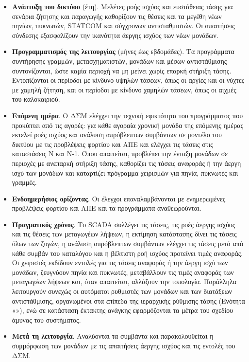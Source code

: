 \begin{itemize}
\item \textbf{Ανάπτυξη του δικτύου} (έτη). Μελέτες ροής ισχύος και ευστάθειας τάσης για
      σενάρια ζήτησης και παραγωγής καθορίζουν τις θέσεις και τα μεγέθη νέων πηνίων, πυκνωτών,
      STATCOM και σύγχρονων αντισταθμιστών. Οι απαιτήσεις σύνδεσης εξασφαλίζουν την ικανότητα
      άεργης ισχύος των νέων μονάδων.
\item \textbf{Προγραμματισμός της λειτουργίας} (μήνες έως εβδομάδες). Τα προγράμματα
      συντήρησης γραμμών, μετασχηματιστών, μονάδων και μέσων αντιστάθμισης συντονίζονται,
      ώστε καμία περιοχή να μη μείνει χωρίς επαρκή στήριξη τάσης. Εντοπίζονται οι περίοδοι με
      κίνδυνο υψηλών τάσεων, όπως οι αργίες και οι νύχτες με χαμηλή ζήτηση, και οι περίοδοι με
      κίνδυνο χαμηλών τάσεων, όπως οι αιχμές του καλοκαιριού.
\item \textbf{Επόμενη ημέρα}. Ο ΔΣΜ ελέγχει την τεχνική εφικτότητα του προγράμματος που
      προκύπτει από τις αγορές: για κάθε αγοραία χρονική μονάδα της επόμενης ημέρας εκτελεί
      ροές ισχύος και ανάλυση απρόβλεπτων συμβάντων σε μοντέλο του δικτύου με τις προβλέψεις φορτίου
      και ΑΠΕ και ελέγχει τις τάσεις στις καταστάσεις N και N-1. Όπου απαιτείται, προβλέπει την
      ένταξη μονάδων σε περιοχές με ανεπαρκή στήριξη τάσης, καθορίζει τις τάσεις αναφοράς ή την
      άεργη ισχύ των μονάδων και καταρτίζει πρόγραμμα χειρισμών για πηνία, πυκνωτές και
      γραμμές.
\item \textbf{Ενδοημερήσιος ορίζοντας}. Οι έλεγχοι επαναλαμβάνονται με ενημερωμένες
      προβλέψεις φορτίου και ΑΠΕ και τα προγράμματα αναθεωρούνται.
\item \textbf{Πραγματικός χρόνος}. Το SCADA συλλέγει τις τάσεις, τις ροές άεργης ισχύος και τις
      θέσεις των μεταγωγέων λήψεων, η εκτίμηση κατάστασης δίνει τις τάσεις όλων των ζυγών, η
      ανάλυση απρόβλεπτων συμβάντων ελέγχει τις τάσεις μετά από κάθε συμβάν του καταλόγου και
      η βέλτιστη ροή ισχύος προτείνει τιμές αναφοράς. Οι χειριστές εκδίδουν εντολές για τις
      τάσεις αναφοράς ή την άεργη ισχύ των μονάδων, ζευγνύουν πηνία και πυκνωτές, μεταβάλλουν
      τις τιμές αναφοράς των μεταγωγέων λήψεων και, όταν απαιτείται, αλλάζουν την τοπολογία.
      Παράλληλα λειτουργούν συνεχώς οι αυτόματοι ρυθμιστές των μονάδων και των διατάξεων
      αντιστάθμισης, οργανωμένοι στα επίπεδα της ιεραρχικής ρύθμισης τάσης (Ενότητα
      «»), ενώ σε κατάσταση έκτακτης ανάγκης εφαρμόζονται τα μέτρα του
      σχεδίου άμυνας του συστήματος.
\item \textbf{Μετά τη λειτουργία}. Αναλύονται τα συμβάντα και παρακολουθείται η συμμόρφωση των
      μονάδων με τις απαιτήσεις άεργης ισχύος και τις εντολές του ΔΣΜ.
\end{itemize}


